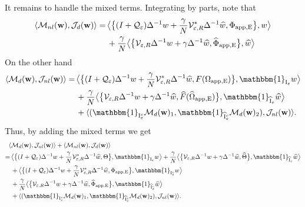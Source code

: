 \documentclass[11pt,reqno,a4paper]{amsart}
\def\eps{\varepsilon}
\newcommand{\cJ}{\mathcal{J}}
\newcommand{\cM}{\mathcal{M}}
\newcommand{\cQ}{\mathcal{Q}}
\newcommand{\cV}{\mathcal{V}}
\newcommand{\1}{\mathbbm{1}}
\theoremstyle{definition}
\theoremstyle{definition}
\numberwithin{equation}{section}
\begin{document}
It remains to handle the mixed terms. Integrating by parts, note that
\begin{align}
    \langle \cM_{nl}({\mathbf w}),\cJ_d({\mathbf w})\rangle=\,& \big\langle \big\{(I+\cQ_{\eps})\Delta^{-1}w+\frac{\gamma}{N}\cV_{\eps,R}^*\Delta^{-1}\widehat{w},\Phi_{\rm app,E}\big\},w\big \rangle\\
    &+\frac{\gamma}{N}\big\langle \big\{\cV_{\eps,R}\Delta^{-1}w+\gamma\Delta^{-1}\widehat{w},\widehat{\Phi}_{\rm app,E}\big\},\widehat{w}\big \rangle
\end{align}
On the other hand
\begin{align}
    \langle \cM_{d}({\mathbf w}),\cJ_{nl}({\mathbf w})\rangle=\,& \big\langle \big\{(I+\cQ_{\eps})\Delta^{-1}w+\frac{\gamma}{N}\cV_{\eps,R}^*\Delta^{-1}\widehat{w},F(\Omega_{\rm app,E})\big\},\mathbbm{1}_{{\rm I}_\eps}w\big \rangle\\
    &+\frac{\gamma}{N}\big\langle \big\{\cV_{\eps,R}\Delta^{-1}w+\gamma\Delta^{-1}\widehat{w},\widehat{F}(\widehat{\Omega}_{\rm app,E})\big\},\mathbbm{1}_{\widehat{{\rm I}}_\eps}\widehat{w}\big \rangle\\
    &+\langle (\mathbbm{1}_{{\rm I}_\eps^c}\cM_{d}({\mathbf w})_1,\mathbbm{1}_{\widehat{{\rm I}}^c_\eps}\cM_{d}({\mathbf w})_2),\cJ_{nl}({\mathbf w})\rangle.
\end{align}
Thus, by adding the mixed terms we  get
\begin{align}
    \langle &\cM_{d}({\mathbf w}),\cJ_{nl}({\mathbf w})\rangle+\langle \cM_{nl}({\mathbf w}),\cJ_{d}({\mathbf w})\rangle\\
    =\,& \big\langle \big\{(I+\cQ_{\eps})\Delta^{-1}w+\frac{\gamma}{N}\cV_{\eps,R}^*\Delta^{-1}\widehat{w},\Theta\big\},\mathbbm{1}_{{\rm I}_\eps}w\big \rangle+\frac{\gamma}{N}\big\langle \big\{\cV_{\eps,R}\Delta^{-1}w+\gamma\Delta^{-1}\widehat{w},\widehat{\Theta}\big\},\mathbbm{1}_{\widehat{{\rm I}}_\eps}\widehat{w}\big \rangle\\
    &
    +\big\langle \big\{(I+\cQ_{\eps})\Delta^{-1}w+\frac{\gamma}{N}\cV_{\eps,R}^*\Delta^{-1}\widehat{w},\Phi_{\rm app,E}\big\},\mathbbm{1}_{{\rm I}_\eps^c}w\big \rangle\\
    &+\frac{\gamma}{N}\big\langle \big\{\cV_{\eps,R}\Delta^{-1}w+\gamma\Delta^{-1}\widehat{w},\widehat{\Phi}_{\rm app,E}\big\},\mathbbm{1}_{\widehat{{\rm I}}^c_\eps}\widehat{w}\big \rangle\\
    &+\langle (\mathbbm{1}_{{\rm I}_\eps^c}\cM_{d}({\mathbf w})_1,\mathbbm{1}_{\widehat{{\rm I}}^c_\eps}\cM_{d}({\mathbf w})_2),\cJ_{nl}({\mathbf w})\rangle.
\end{align}
\end{document}
